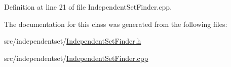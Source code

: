 Definition at line 21 of file Independent\-Set\-Finder.\-cpp.



The documentation for this class was generated from the following files\-:\begin{DoxyCompactItemize}
\item 
src/independentset/\hyperlink{_independent_set_finder_8h}{Independent\-Set\-Finder.\-h}\item 
src/independentset/\hyperlink{_independent_set_finder_8cpp}{Independent\-Set\-Finder.\-cpp}\end{DoxyCompactItemize}
